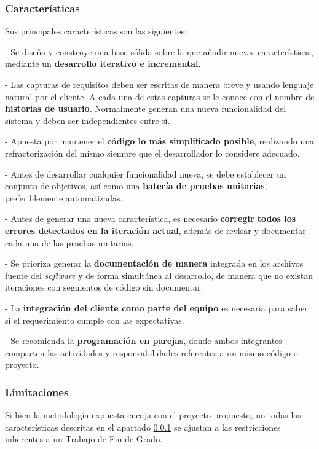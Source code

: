 \subsubsection{Características} \label{subsub:methoXPcaract}

Sus principales características son las siguientes:\sn

- Se diseña y construye una base sólida sobre la que añadir nuevas características, mediante un \textbf{desarrollo iterativo e incremental}.\sn

- Las capturas de requisitos deben ser escritas de manera breve y usando lenguaje natural por el cliente. A cada una de estas capturas se le conoce con el nombre de \textbf{historias de usuario}. Normalmente generan una nueva funcionalidad del sistema y deben ser independientes entre sí.\n

- Apuesta por mantener el \textbf{código lo más simplificado posible}, realizando una refractorización del mismo siempre que el desarrollador lo considere adecuado.\sn

- Antes de desarrollar cualquier funcionalidad nueva, se debe establecer un conjunto de objetivos, así como una \textbf{batería de pruebas unitarias}, preferiblemente automatizadas.\sn

- Antes de generar una nueva característica, es necesario \textbf{corregir todos los errores detectados en la iteración actual}, además de revisar y documentar cada una de las pruebas unitarias.\sn

- Se prioriza generar la \textbf{documentación de manera} integrada en los archivos fuente del \textit{software} y de forma simultánea al desarrollo, de manera que no existan iteraciones con segmentos de código sin documentar.\sn

- La \textbf{integración del cliente como parte del equipo} es necesaria para saber si el requerimiento cumple con las expectativas.\sn

- Se recomienda la \textbf{programación en parejas}, donde ambos integrantes comparten las actividades y responsabilidades referentes a un mismo código o proyecto.\n

\subsubsection{Limitaciones} \label{subsub:methoXPlimit}

Si bien la metodología expuesta encaja con el proyecto propuesto, no todas las características descritas en el apartado \ref{subsub:methoXPcaract} se ajustan a las restricciones inherentes a un Trabajo de Fin de Grado.\sn


